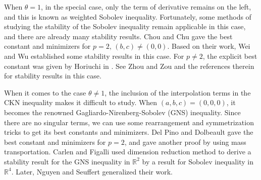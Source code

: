 \documentclass[11pt]{article}
\newcommand{\R}{\mathbb{R}}
\numberwithin{equation}{section}
\begin{document}
\vskip0.1in
 When $\theta=1$, in the special case,  only the term of derivative remains on the left, and this is known as weighted Sobolev inequality. Fortunately, some methods of studying the stability of the Sobolev inequality remain applicable in this case, and there are already many stability results.  Chou and Chu \cite{Chou1993} gave the   best constant and minimizers for $p=2,\, (b,c)\neq (0,0)$. Based on their work, Wei and Wu \cite{Wei2022} established some stability results in this case. For $p\neq 2$, the explicit best constant was given by Horiuchi in \cite{Toshio1997}. See Zhou and Zou \cite{Zhou2024} and the references therein for stability results in this case.

\vskip0.1in

When it comes to the case $\theta\neq 1$, the inclusion of the interpolation terms in the CKN inequality makes it difficult to study. When $(a,b,c)=(0,0,0)$, it becomes the renowned Gagliardo-Nirenberg-Sobolev (GNS) inequality. Since there are no singular terms, we can use some rearrangement and symmetrization tricks to get its best constants and minimizers. Del Pino and Dolbeault \cite{DelPino2002} gave the best constant and minimizers for $p=2$, and \cite{Cordero-Erausquin2004} gave another proof by using mass transportation. Carlen and Figalli \cite{Carlen2013} used dimension reduction method to derive a stability result for the GNS inequality in $\R^2$ by a result for Sobolev inequality in $\R^4$. Later, Nguyen \cite{Nguyen2019} and Seuffert \cite{Seuffert2016} generalized their work.


\vskip0.1in
\end{document}
